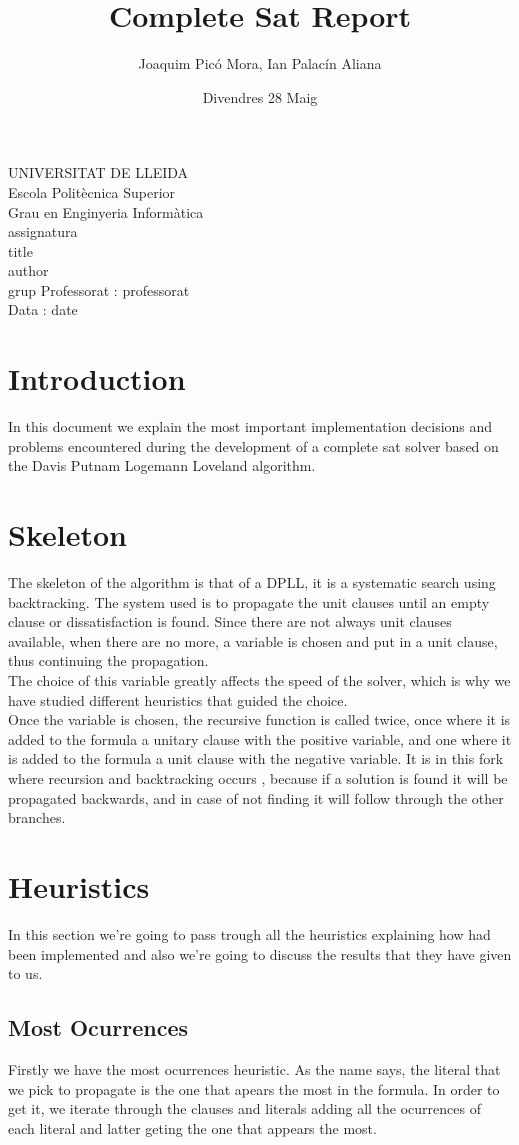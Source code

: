 \documentclass{article}
\title{Complete Sat Report}
\author{Joaquim Picó Mora, Ian Palacín Aliana}
\date{Divendres 28 Maig}
\renewcommand{\maketitle}{ %
	\begin{titlepage}
		\raggedright{UNIVERSITAT DE LLEIDA \\
			Escola Politècnica Superior \\
			Grau en Enginyeria Informàtica\\
			\1assignatura\\}
		\vspace{5cm}
		\centering\huge{\5title \\}
		\vspace{3cm}
		\large{\6author} \\
		\normalsize{\3grup}
		\vfill
		Professorat : \4professorat \\
		Data : \7date
\end{titlepage}}
\begin{document}
	\maketitle
	\thispagestyle{empty}


\section{Introduction}
In this document we explain the most important implementation decisions and problems
encountered during the development of a complete sat solver based on the Davis Putnam
Logemann Loveland algorithm.
%
\section{Skeleton}

The skeleton of the algorithm is that of a DPLL, it is a systematic search using backtracking.
The system used is to propagate the unit clauses until an empty clause  or
dissatisfaction is found. Since there are not always unit clauses available, when
there are no more, a variable is chosen and put in a unit clause, thus continuing the
propagation. \\

The choice of this variable greatly affects the speed of the solver, which is why we have studied
different heuristics that guided the choice. \\

Once the variable is chosen, the recursive function is called twice, once where it is added
to the formula a unitary clause with the positive variable, and one where it is added to the formula
a unit clause with the negative variable. It is in this fork where recursion and backtracking occurs
, because if a solution is found it will be propagated backwards, and in case of
not finding it will follow through the other branches.

%
\section{Heuristics}
In this section we're going to pass trough all the heuristics explaining how had been implemented and also we're going to discuss the results that they have given to us. 
\subsection{Most Ocurrences}
Firstly we have the most ocurrences heuristic. As the name says, the literal that we pick to propagate is the one that apears the most in the formula. In order to get it, we iterate through the clauses and literals adding all the ocurrences of each literal and latter geting the one that appears the most.
\end{document}
